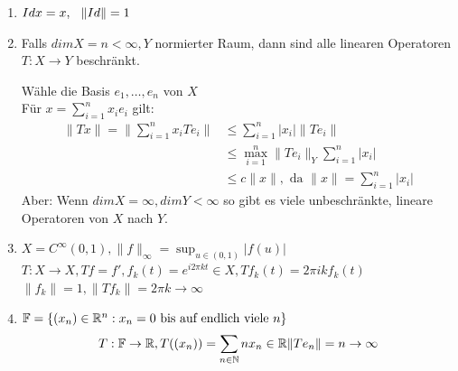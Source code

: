 \begin{beispiel}
	\begin{enumerate}[label=\alph*\upshape)]
		\item $Id x = x, \hspace{0.25cm} \|  Id \| = 1$
		\item Falls $dim X = n < \infty, Y$ normierter Raum, dann sind alle linearen Operatoren $T: X \rightarrow Y$ beschränkt.
		\begin{beweis}
			Wähle die Basis $e_{1}, \dotsc, e_{n}$ von $X$ \\
			Für $x = \sum_{i = 1}^{n} x_{i} e_{i}$ gilt:
			\begin{align*}
				\| Tx \| = \| \sum_{i = 1}^{n} x_{i} T e_{i} \| & \leq \sum_{i = 1}^{n} | x_{i} | \| T e_{i} \| \\
				& \leq \max_{i = 1}^{n} \| T e_{i} \|_{Y} \sum_{i = 1}^{n} |x_{i}| \\
				& \leq c \| x \|, \text{ da } \| x \| = \sum_{i = 1}^{n} |x_{i} |
			\end{align*}	
			Aber: Wenn $dim X = \infty, dim Y < \infty$ so gibt es viele unbeschränkte, lineare Operatoren von $X$ nach $Y$.
		\end{beweis}
		\item $X = C^{\infty}(0, 1), \| f \|_{\infty} = \sup_{u \in (0, 1)} |f(u)|$ \\
		$T:X \rightarrow X, Tf = f', f_{k}(t) = e^{i 2 \pi k t} \in X, Tf_{k}(t) = 2 \pi i k f_{k}(t)$ \\ 
		$ \| f_{k} \| = 1, \| Tf_{k} \| = 2 \pi k \rightarrow \infty $
		\item $\mathbb{F} = \{ (x_{n}) \in \mathbb{R}^{n}: x_{n} = 0 \text{ bis auf endlich viele } n \}$ \\
			\[ 
			  T: \mathbb{F} \rightarrow \mathbb{R}, T( (x_{n}) ) = \sum_{n \in \mathbb{N}} n x_{n} \in \mathbb{R}
			 \| T e_{n} \| = n \rightarrow \infty
			\]
	\end{enumerate}	
\end{beispiel}

